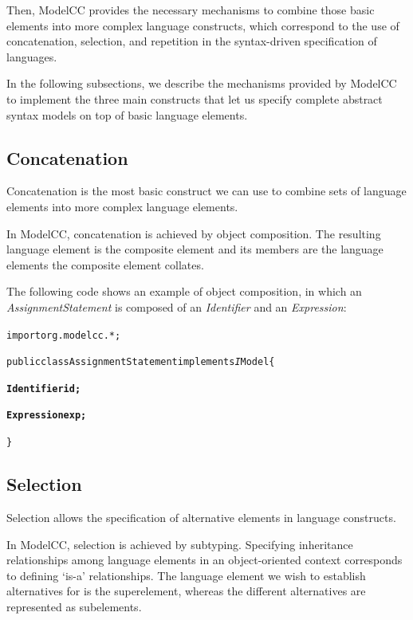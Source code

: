 \documentclass[a4paper,twoside,onecolumn]{article}
\newenvironment{colframe}{%
  \begin{Sbox} 
    \begin{minipage}{.8\columnwidth} 
}{%

  \end{minipage} 
  \end{Sbox} 
  \begin{center} 
    \fcolorbox{black}{MyGray}{\TheSbox} 
  \end{center} 
}
\begin{document}
Then, ModelCC provides the necessary mechanisms to combine those basic elements into more complex language constructs, which correspond to the use of concatenation, selection, and repetition in the syntax-driven specification of languages.

In the following subsections, we describe the mechanisms provided by ModelCC to implement the three main constructs that let us specify complete abstract syntax models on top of basic
language elements.

\subsection{Concatenation}

Concatenation is the most basic construct we can use to combine sets of language elements into more complex language elements.

In ModelCC, concatenation is achieved by object composition. The resulting language element is the composite element and its members are the language elements the composite element collates.

The following code shows an example of object composition, in which an \emph{AssignmentStatement} is composed of an \emph{Identifier} and an \emph{Expression}:

\begin{colframe}
\begin{alltt}
import org.modelcc.*;

public class AssignmentStatement implements{\emph IModel} \{

  {\bf Identifier id;}

  {\bf Expression exp;}

\}
\end{alltt}
\end{colframe}

\subsection{Selection}

Selection allows the specification of alternative elements in language constructs.

In ModelCC, selection is achieved by subtyping. Specifying inheritance relationships among language elements in an object-oriented context
corresponds to defining `is-a' relationships. The language element we wish to establish alternatives for is the superelement, whereas the different alternatives are
represented as subelements.
\end{document}
